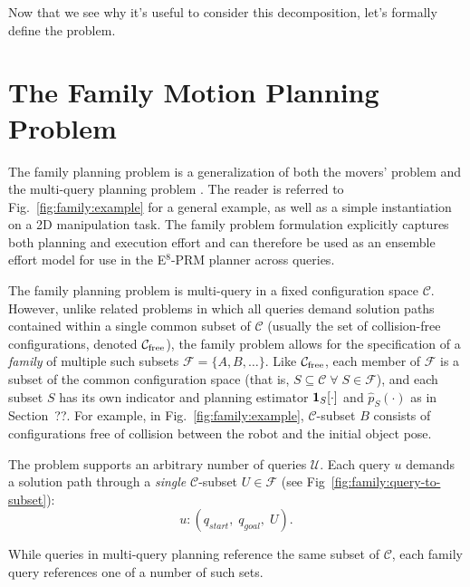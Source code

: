 Now that we see why it's useful to consider this decomposition,
let's formally define the problem.

\section{The Family Motion Planning Problem}
\label{sec:family:formulation}

The family planning problem is
a generalization of both the movers' problem
and the multi-query planning problem%
\cite{kavrakietal1996prm}.
The reader is referred to
Fig.~\ref{fig:family:example}
for a general example,
as well as a simple instantiation on a 2D manipulation task.
The family problem formulation
explicitly captures both planning and execution effort
and can therefore be used as an ensemble effort model
for use in the E$^8$-PRM planner across queries.

The family planning problem is multi-query in
a fixed configuration space $\mathcal{C}$.
However, unlike related problems in which all
queries demand solution paths contained within a single common subset of
$\mathcal{C}$
(usually the set of collision-free configurations, denoted
$\mathcal{C}_{\mbox{\scriptsize free}}$),
the family problem allows for the specification of
a \emph{family} of multiple such subsets
$\mathcal{F} = \{ A, B, \dots \}$.
Like $\mathcal{C}_{\mbox{\scriptsize free}}$,
each member of $\mathcal{F}$
is a subset of the common configuration space
(that is,
$S \subseteq \mathcal{C} \;\forall\; S \in \mathcal{F}$),
and each subset $S$ has its own indicator and planning estimator
${\bf 1}_S[\cdot]$ and $\hat{p}_S(\cdot)$
as in Section~??.
For example,
in Fig.~\ref{fig:family:example},
$\mathcal{C}$-subset $B$
consists of configurations
free of collision between the robot and
the initial object pose.

The problem supports an arbitrary number of queries $\mathcal{U}$.
Each query $u$ demands a solution path through a \emph{single}
$\mathcal{C}$-subset $U \in \mathcal{F}$
(see Fig~\ref{fig:family:query-to-subset}):
\begin{equation}
  u : ( q_{start},\; q_{goal},\; U ) .
  \label{eqn:family:q}
\end{equation}

\begin{marginfigure}
   \centering
   \vspace{-0.05in}
   \vspace{0.1in}
   \caption{While queries in multi-query planning reference
     the same subset of $\mathcal{C}$,
     each family query references one of a number of such sets.}
   \label{fig:family:query-to-subset}
\end{marginfigure}

